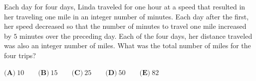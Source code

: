 Each day for four days, Linda traveled for one hour at a speed that resulted in her traveling one mile in an integer number of minutes. Each day after the first, her speed decreased so that the number of minutes to travel one mile increased by $5$ minutes over the preceding day. Each of the four days, her distance traveled was also an integer number of miles. What was the total number of miles for the four trips?

$\textbf{(A)}\ 10\qquad\textbf{(B)}\ 15\qquad\textbf{(C)}\ 25\qquad\textbf{(D)}\ 50\qquad\textbf{(E)}\ 82$
